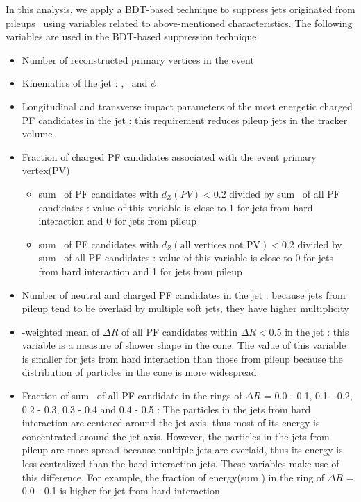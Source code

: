 In this analysis, we apply a BDT-based technique to suppress jets originated 
from pileups~\cite{x} using variables related to above-mentioned characteristics. 
The following variables are used in the BDT-based suppression technique
\begin{itemize}
\item Number of reconstructed primary vertices in the event 

\item Kinematics of the jet : \pt, \Eta\ and $\phi$ 

\item Longitudinal and transverse impact parameters of the most energetic 
      charged PF candidates in the jet : this requirement reduces pileup 
      jets in the tracker volume

\item Fraction of charged PF candidates associated with the event primary vertex(PV) 
    \begin{itemize}
    \item sum \pt\ of PF candidates with $d_Z(PV) < 0.2$ 
          divided by sum \pt\ of all PF candidates : value of this variable is close to 1 
          for jets from hard interaction and 0 for jets from pileup
           
    \item sum \pt\ of PF candidates with $d_Z(\textrm{all vertices not PV}) < 0.2$
          divided by sum \pt\ of all PF candidates : value of this variable is close to 0 
          for jets from hard interaction and 1 for jets from pileup
    \end{itemize} 

\item Number of neutral and charged PF candidates in the jet : because jets from pileup 
      tend to be overlaid by multiple soft jets, they have higher multiplicity 

\item \pt-weighted mean of $\Delta R$ of all PF candidates within $\Delta R < 0.5$          
      in the jet : this variable is a measure of shower shape in the cone. 
      The value of this variable is smaller for jets from hard interaction 
      than those from pileup because the distribution of particles in the 
      cone is more widespread.

\item Fraction of sum \pt\ of all PF candidate in the rings of 
      $\Delta R$ = 0.0 - 0.1, 0.1 - 0.2, 0.2 - 0.3, 0.3 - 0.4 and 0.4 - 0.5 : 
      The particles in the jets from hard interaction are centered around the 
      jet axis, thus most of its energy is concentrated around the jet axis. 
      However, the particles in the jets from pileup are more spread because 
      multiple jets are overlaid, thus its energy is less centralized than the 
      hard interaction jets. These variables make use of this difference. For example, 
      the fraction of energy(sum \pt) in the ring of $\Delta R$ = 0.0 - 0.1 is higher 
      for jet from hard interaction.   


\end{itemize}
